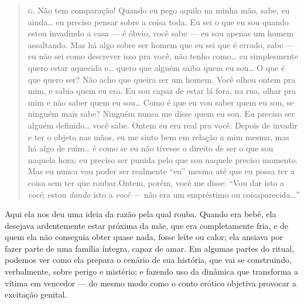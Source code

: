 \begin{quote}
\noindent\hskip0mm\textsc{g.} Não tem comparação! Quando eu pego aquilo na minha mão, sabe, eu
ainda\ldots{} eu preciso pensar sobre a coisa toda. Eu sei o que eu sou
quando estou invadindo a casa --- é óbvio, você sabe --- eu sou
apenas um homem assaltando. Mas há algo sobre ser homem que eu sei que
é errado, sabe --- eu não sei como descrever isso pra você, não tenho
como\ldots{} eu simplesmente quero estar aquecida e\ldots{} quero que alguém
saiba quem eu sou\ldots{} O que é que quero ser? Não acho que queira ser um
homem. Você olhou ontem pra mim, e sabia quem eu era. Eu sou capaz de
estar lá fora, na rua, olhar pra mim e não saber quem eu sou\ldots{} Como é
que eu vou saber quem eu sou, se ninguém mais sabe? Ninguém nunca me
disse quem eu sou. Eu preciso ser alguém definido\ldots{} você sabe. Ontem
eu era real pra você. Depois de invadir e ter o objeto nas mãos, eu me
sinto bem em relação a mim mesma, mas há algo de ruim\ldots{} é como se eu
não tivesse o direito de ser o que sou naquela hora; eu preciso ser
punida pelo que sou naquele preciso momento. Mas eu nunca vou poder ser
realmente ``eu'' mesma até que eu possa ter a
coisa sem ter que roubar.\idxiden[|)] Ontem, porém, você me disse:
``Vou dar isto a \textit{você}; estou \textit{dando} isto
a \textit{você} --- não era um empréstimo ou coisa\idxidenhis[|)]
parecida\ldots{}''

\end{quote}

\bigskip

Aqui ela nos deu uma ideia da razão pela qual rouba. Quando era
bebê, ela desejava ardentemente estar próxima da mãe, que era
completamente fria, e de quem ela não conseguia obter quase nada, fosse
leite ou calor; ela ansiava por fazer parte de uma família íntegra,
capaz de amar. Em algumas partes do ritual, podemos ver como ela
prepara o cenário de sua história, que vai se construindo, verbalmente,
sobre perigo e mistério; e fazendo uso da dinâmica que transforma a
vítima em vencedor --- do mesmo modo como o conto erótico objetiva
provocar a excitação genital.


